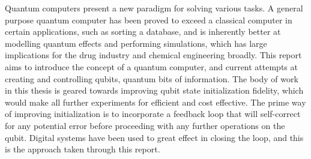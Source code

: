 Quantum computers present a new paradigm for solving various tasks. A general purpose quantum computer has been proved to exceed a classical computer in certain applications, such as sorting a database, and is inherently better at modelling quantum effects and performing simulations, which has large implications for the drug industry and chemical engineering broadly. This report aims to introduce the concept of a quantum computer, and current attempts at creating and controlling qubits, quantum bits of information. The body of work in this thesis is geared towards improving qubit state initialization fidelity, which would make all further experiments for efficient and cost effective. The prime way of improving initialization is to incorporate a feedback loop that will self-correct for any potential error before proceeding with any further operations on the qubit. Digital systems have been used to great effect in closing the loop, and this is the approach taken through this report.